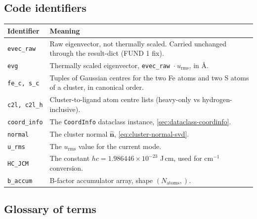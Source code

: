 \documentclass[10pt,a4paper,twoside]{article}
\newcommand{\nhat}{\hat{\mathbf{n}}}
\newcommand{\urms}{u_{\mathrm{rms}}}
\newcommand{\fn}[1]{\texttt{#1}}
\begin{document}
\subsection*{Code identifiers}

\begin{longtable}{p{} p{}}
\toprule
\textbf{Identifier} & \textbf{Meaning} \\
\midrule
\fn{evec\_raw}        & Raw eigenvector, not thermally scaled.
                          Carried unchanged through the result-dict
                          (FUND 1 fix). \\
\fn{evg}              & Thermally scaled eigenvector,
                          \fn{evec\_raw}~$\cdot~\urms$, in \AA{}. \\
\fn{fe\_c, s\_c}      & Tuples of Gaussian centres for the two
                          Fe atoms and two S atoms of a cluster, in
                          canonical order. \\
\fn{c2l, c2l\_h}      & Cluster-to-ligand atom centre lists
                          (heavy-only vs hydrogen-inclusive). \\
\fn{coord\_info}      & The \fn{CoordInfo} dataclass instance,
                          \cref{sec:dataclass-coordinfo}. \\
\fn{normal}           & The cluster normal $\nhat$,
                          \cref{eq:cluster-normal-svd}. \\
\fn{u\_rms}           & The $\urms$ value for the current mode. \\
\fn{HC\_JCM}          & The constant $hc = 1.986446 \times 10^{-23}$
                          J\,cm, used for cm$^{-1}$ conversion. \\
\fn{b\_accum}         & B-factor accumulator array,
                          shape $(N_\text{atoms},)$. \\
\bottomrule
\end{longtable}

\subsection*{Glossary of terms}
\end{document}
